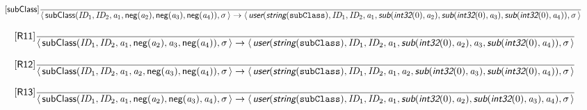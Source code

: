 \documentclass[10pt,leqno]{article}
\newcommand{\artVariable}[1]{\mbox{\em #1\/}}
\newcommand{\artConstructor}[1]{\mbox{\sf #1}}
\newcommand{\artCaseInsensitiveLiteral}[1]{\mbox{\tt #1}}
\newcommand{\artSpecial}[1]{\mbox{\sf\em #1}}
\begin{document}
\begin{equation}
\tag*{[\artConstructor{\sf subClass}]}\frac{}{\langle\, \artConstructor{\sf subClass}(\artVariable{ID$_{1}$}, \artVariable{ID$_{2}$}, \artVariable{a$_{1}$}, \artConstructor{\sf neg}(\artVariable{a$_{2}$}), \artConstructor{\sf neg}(\artVariable{a$_{3}$}), \artConstructor{\sf neg}(\artVariable{a$_{4}$})), \artVariable{$\sigma$}\,\rangle \rightarrow \langle\, \artSpecial{user}(\artSpecial{string}(\artCaseInsensitiveLiteral{subClass}), \artVariable{ID$_{1}$}, \artVariable{ID$_{2}$}, \artVariable{a$_{1}$}, \artSpecial{sub}(\artSpecial{int32}(0), \artVariable{a$_{2}$}), \artSpecial{sub}(\artSpecial{int32}(0), \artVariable{a$_{3}$}), \artSpecial{sub}(\artSpecial{int32}(0), \artVariable{a$_{4}$})), \artVariable{$\sigma$}\,\rangle }
\end{equation}

\begin{equation}
\tag*{[\artConstructor{\sf R11}]}\frac{}{\langle\, \artConstructor{\sf subClass}(\artVariable{ID$_{1}$}, \artVariable{ID$_{2}$}, \artVariable{a$_{1}$}, \artConstructor{\sf neg}(\artVariable{a$_{2}$}), \artVariable{a$_{3}$}, \artConstructor{\sf neg}(\artVariable{a$_{4}$})), \artVariable{$\sigma$}\,\rangle \rightarrow \langle\, \artSpecial{user}(\artSpecial{string}(\artCaseInsensitiveLiteral{subClass}), \artVariable{ID$_{1}$}, \artVariable{ID$_{2}$}, \artVariable{a$_{1}$}, \artSpecial{sub}(\artSpecial{int32}(0), \artVariable{a$_{2}$}), \artVariable{a$_{3}$}, \artSpecial{sub}(\artSpecial{int32}(0), \artVariable{a$_{4}$})), \artVariable{$\sigma$}\,\rangle }
\end{equation}

\begin{equation}
\tag*{[\artConstructor{\sf R12}]}\frac{}{\langle\, \artConstructor{\sf subClass}(\artVariable{ID$_{1}$}, \artVariable{ID$_{2}$}, \artVariable{a$_{1}$}, \artVariable{a$_{2}$}, \artConstructor{\sf neg}(\artVariable{a$_{3}$}), \artConstructor{\sf neg}(\artVariable{a$_{4}$})), \artVariable{$\sigma$}\,\rangle \rightarrow \langle\, \artSpecial{user}(\artSpecial{string}(\artCaseInsensitiveLiteral{subClass}), \artVariable{ID$_{1}$}, \artVariable{ID$_{2}$}, \artVariable{a$_{1}$}, \artVariable{a$_{2}$}, \artSpecial{sub}(\artSpecial{int32}(0), \artVariable{a$_{3}$}), \artSpecial{sub}(\artSpecial{int32}(0), \artVariable{a$_{4}$})), \artVariable{$\sigma$}\,\rangle }
\end{equation}

\begin{equation}
\tag*{[\artConstructor{\sf R13}]}\frac{}{\langle\, \artConstructor{\sf subClass}(\artVariable{ID$_{1}$}, \artVariable{ID$_{2}$}, \artVariable{a$_{1}$}, \artConstructor{\sf neg}(\artVariable{a$_{2}$}), \artConstructor{\sf neg}(\artVariable{a$_{3}$}), \artVariable{a$_{4}$}), \artVariable{$\sigma$}\,\rangle \rightarrow \langle\, \artSpecial{user}(\artSpecial{string}(\artCaseInsensitiveLiteral{subClass}), \artVariable{ID$_{1}$}, \artVariable{ID$_{2}$}, \artVariable{a$_{1}$}, \artSpecial{sub}(\artSpecial{int32}(0), \artVariable{a$_{2}$}), \artSpecial{sub}(\artSpecial{int32}(0), \artVariable{a$_{3}$}), \artVariable{a$_{4}$}), \artVariable{$\sigma$}\,\rangle }
\end{equation}
\end{document}
